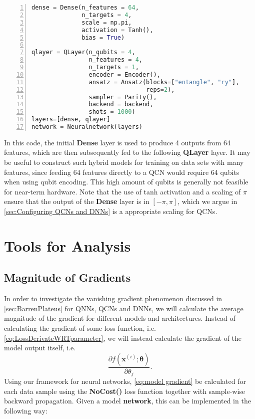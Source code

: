 \begin{lstlisting}[language=python, numbers=left]
dense = Dense(n_features = 64,
              n_targets = 4,
              scale = np.pi,
              activation = Tanh(),
              bias = True)
              
qlayer = QLayer(n_qubits = 4,
                n_features = 4,
                n_targets = 1,
                encoder = Encoder(),
                ansatz = Ansatz(blocks=["entangle", "ry"],
                                reps=2),
                sampler = Parity(),
                backend = backend,
                shots = 1000)
layers=[dense, qlayer]       
network = Neuralnetwork(layers)
\end{lstlisting}
In this code, the initial \textbf{Dense} layer is used to produce 4 outputs from 64 features, which are then subsequently fed to the following \textbf{QLayer} layer. It may be useful to construct such hybrid models for training on data sets with many features, since feeding 64 features directly to a QCN would require 64 qubits when using qubit encoding. This high amount of qubits is generally not feasible for near-term hardware. Note that the use of tanh activation and a scaling of $\pi$ ensure that the output of the \textbf{Dense} layer is in $[-\pi, \pi]$, which we argue in \autoref{sec:Configuring QCNs and DNNs} is a appropriate scaling for QCNs.


\section{Tools for Analysis}\label{sec:Tools for Analysis Imp}

\subsection{Magnitude of Gradients}\label{sec:Magnitude of Gradients}
In order to investigate the vanishing gradient phenomenon discussed in \autoref{sec:BarrenPlateus} for QNNs, QCNs and DNNs, we will calculate the average magnitude of the gradient for different models and architectures. Instead of calculating the gradient of some loss function, i.e. \autoref{eq:LossDerivateWRTparameter}, we will instead calculate the gradient of the model output itself, i.e.
\begin{equation}\label{eq:model gradient}
    \frac{\partial f(\boldsymbol{x}^{(i)};\boldsymbol{\theta})}{\partial \theta_j}.
\end{equation}
Using our framework for neural networks, \autoref{eq:model gradient} be calculated for each data sample using the \textbf{NoCost()} loss function together with sample-wise backward propagation. Given a model \textbf{network}, this can be implemented in the following way:

